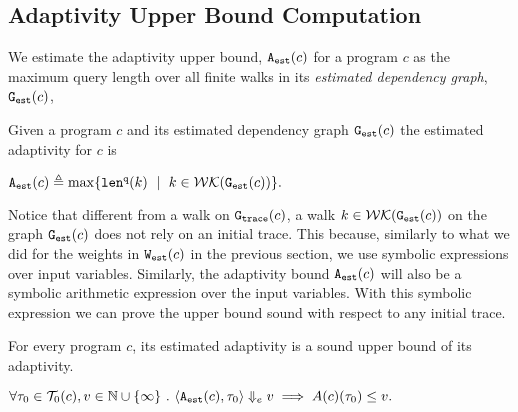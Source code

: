 \subsection{Adaptivity Upper Bound Computation}
\label{sec:alg_adaptcompute}
We estimate the adaptivity upper bound, 
${\mathtt{A_{est}}}(c)$ for a program $c$ as the maximum query length over all finite walks 
in its \emph{estimated dependency graph}, $\mathtt{{G_{est}}}({c})$,
%

\begin{defn}
\label{def:prog_adapt}
{
Given a program ${c}$ and its estimated dependency graph 
$\mathtt{{G_{est}}}({c})$
the estimated adaptivity for $c$ is 
\begin{center}
$
\progA({c})
\triangleq \max
\left\{ \qlen(k) \ \mid \  k \in \walks(\progG(c))\right \}.
$
\end{center}
}
\end{defn}



Notice that different from a walk on $\mathtt{{G_{trace}}}(c)$, a walk $k \in \mathcal{WK}(\mathtt{{G_{est}}}(c))$ on the graph $\mathtt{{G_{est}}}(c)$  does not rely on an initial trace. This because, similarly to what we did for the weights in $\mathtt{{W_{est}}}(c)$ in the previous section, we use symbolic expressions over input variables. Similarly, the adaptivity bound ${\mathtt{A_{est}}}(c)$ will also be a symbolic arithmetic expression over the input variables. With this symbolic expression we can prove the upper bound sound with respect to any initial trace. 

%
\begin{thm}
    \label{thm:sound_progadapt}
    For every program $c$, 
    its estimated adaptivity is a sound upper bound of its adaptivity.
\begin{center}
$
     \forall \mathtt{\tau}_0 \in \mathcal{T}_{0}(c), v \in \mathbb{N}\cup \{\infty\} ~.~ 
\langle {\ensuremath{\mathtt{A_{est}}}}(c), \mathtt{\tau}_0 \rangle \Downarrow_e v \implies A(c)(\mathtt{\tau}_0) \leq v.
$
\end{center}
\end{thm}


